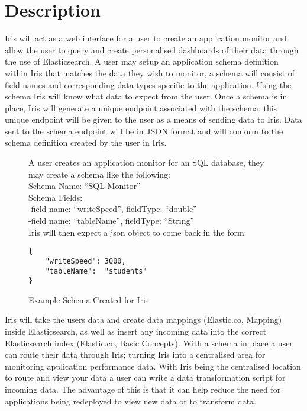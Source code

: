 \documentclass[12pt,a4paper,titlepage]{report}
\newcommand{\q}[1]{``#1''}
\begin{document}
\section{Description}
Iris will act as a web interface for a user to create an application monitor and allow the user to query and create personalised dashboards of their data through the use of Elasticsearch. A user may setup an application schema definition within Iris that matches the data they wish to monitor, a schema will consist of field names and corresponding data types specific to the application. Using the schema Iris will know what data to expect from the user. Once a schema is in place, Iris will generate a unique endpoint associated with the schema, this unique endpoint will be given to the user as a means of sending data to Iris. Data sent to the schema endpoint will be in JSON format and will conform to the schema definition created by the user in Iris.
\begin{figure}[H]
\begin{tcolorbox}
A user creates an application monitor for an SQL database, they may create a schema like the following:
\\
Schema Name: \q{SQL Monitor}
\\
Schema Fields: 
\\
	-field name: \q{writeSpeed}, fieldType: \q{double}
\\
	-field name: \q{tableName}, fieldType: \q{String}
\\
Iris will then expect a json object to come back in the form:
\begin{verbatim}
{
	"writeSpeed": 3000,
	"tableName":  "students"
}
\end{verbatim}
\end{tcolorbox}
\caption{Example Schema Created for Iris}
\end{figure}

Iris will take the users data and create data mappings (Elastic.co, Mapping) inside Elasticsearch, as well as insert any incoming data into the correct Elasticsearch index (Elastic.co, Basic Concepts). With a schema in place a user can route their data through Iris; turning Iris into a centralised area for monitoring application performance data. With Iris being the centralised location to route and view your data a user can write a data transformation script for incoming data. The advantage of this is that it can help reduce the need for applications being redeployed to view new data or to transform data.
\end{document}
